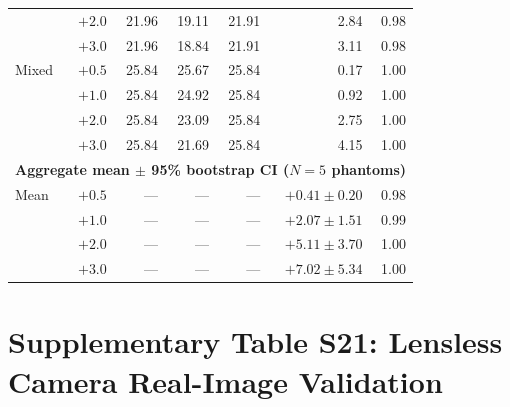 \documentclass[11pt]{article}
\theoremstyle{definition}
\begin{document}
\begin{table}[htbp]
\begin{tabular}{l r r r r r r}
             & $+2.0$ & 21.96 & 19.11 & 21.91 &  2.84 & 0.98 \\
             & $+3.0$ & 21.96 & 18.84 & 21.91 &  3.11 & 0.98 \\
Mixed        & $+0.5$ & 25.84 & 25.67 & 25.84 &  0.17 & 1.00 \\
             & $+1.0$ & 25.84 & 24.92 & 25.84 &  0.92 & 1.00 \\
             & $+2.0$ & 25.84 & 23.09 & 25.84 &  2.75 & 1.00 \\
             & $+3.0$ & 25.84 & 21.69 & 25.84 &  4.15 & 1.00 \\
\midrule
\multicolumn{7}{l}{\textbf{Aggregate mean $\pm$ 95\% bootstrap CI ($N{=}5$ phantoms)}} \\
\midrule
Mean & $+0.5$ & --- & --- & --- & $+0.41 \pm 0.20$ & 0.98 \\
     & $+1.0$ & --- & --- & --- & $+2.07 \pm 1.51$ & 0.99 \\
     & $+2.0$ & --- & --- & --- & $+5.11 \pm 3.70$ & 1.00 \\
     & $+3.0$ & --- & --- & --- & $+7.02 \pm 5.34$ & 1.00 \\
\bottomrule
\end{tabular}
\end{table}



\section{Supplementary Table S21: Lensless Camera Real-Image Validation}
\label{sec:lensless_real}
\end{document}
